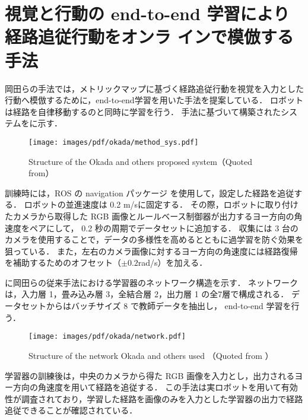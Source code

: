 \section{視覚と行動の end-to-end 学習により経路追従行動をオンラ
インで模倣する手法}
岡田らの手法では，メトリックマップに基づく経路追従行動を視覚を入力とした行動へ模倣するために，end-to-end学習を用いた手法を提案している．
ロボットは経路を自律移動するのと同時に学習を行う．
手法に基づいて構築されたシステムをに示す．

\begin{figure}[htbp]
  \centering
   \texttt{[image: images/pdf/okada/method\_sys.pdf]}
   \caption[Structure of the Okada and others proposed system]{Structure of the Okada and others proposed system（Quoted from\cite{okada2020}）}
   \label{fig:okada_sys}
\end{figure}

訓練時には，ROS の navigation パッケージ \cite{ros}を使用して，設定した経路を追従する．
ロボットの並進速度は 0.2 m/sに固定する．
その際，ロボットに取り付けたカメラから取得した RGB 画像とルールベース制御器が出力するヨー方向の角速度をペアにして， 0.2 秒の周期でデータセットに追加する．
収集には 3 台のカメラを使用することで，データの多様性を高めるとともに過学習を防ぐ効果を狙っている．
また，左右のカメラ画像に対するヨー方向の角速度には経路復帰を補助するためのオフセット（\(\pm 0.2\)rad/s）を加える．

\newpage
{}に岡田らの従来手法における学習器のネットワーク構造を示す．
ネットワークは，入力層 1，畳み込み層 3，全結合層 2，出力層 1 の全7層で構成される．
データセットからはバッチサイズ 8 で教師データを抽出し， end-to-end 学習を行う．

\begin{figure}[htbp]
    \centering
     \texttt{[image: images/pdf/okada/network.pdf]}
     \caption[Structure of the network Okada and others used]{Structure of the network Okada and others used （Quoted from \cite{okada2020}）}
     \label{fig:okada_net}
\end{figure}

学習器の訓練後は，中央のカメラから得た RGB 画像を入力とし，出力されるヨー方向の角速度を用いて経路を追従する．
この手法は実ロボットを用いて有効性が調査されており，学習した経路を画像のみを入力とした学習器の出力で経路追従できることが確認されている．
